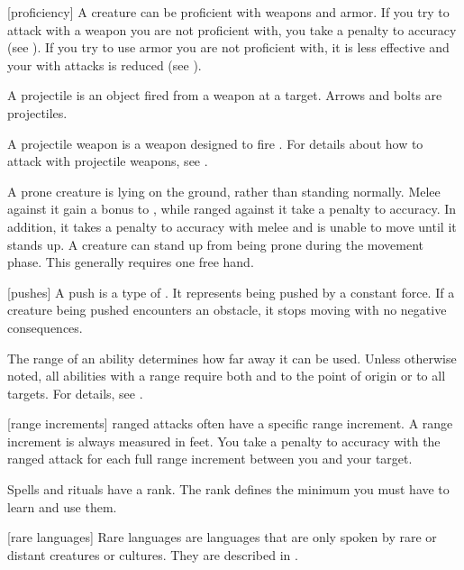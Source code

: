 [proficiency] A creature can be proficient with weapons and armor.
If you try to attack with a weapon you are not proficient with, you take a  penalty to accuracy (see ).
If you try to use armor you are not proficient with, it is less effective and your  with  attacks is reduced (see ).

 A projectile is an object fired from a weapon at a target.
Arrows and bolts are projectiles.

 A projectile weapon is a weapon designed to fire .
For details about how to attack with projectile weapons, see .

 A prone creature is lying on the ground, rather than standing normally.
Melee  against it gain a  bonus to , while ranged  against it take a  penalty to accuracy.
In addition, it takes a  penalty to accuracy with melee  and is unable to move until it stands up.
A creature can stand up from being prone during the movement phase.
This generally requires one free hand.

[pushes] A push is a type of .
It represents being pushed by a constant force.
If a creature being pushed encounters an obstacle, it stops moving with no negative consequences.

 The range of an ability determines how far away it can be used.
Unless otherwise noted, all abilities with a range require both  and  to the point of origin or to all targets.
For details, see .

[range increments]  ranged attacks often have a specific range increment.
A range increment is always measured in feet.
You take a  penalty to accuracy with the ranged attack for each full range increment between you and your target.

 Spells and rituals have a rank.
The rank defines the minimum  you must have to learn and use them.

[rare languages] Rare languages are languages that are only spoken by rare or distant creatures or cultures.
They are described in .

